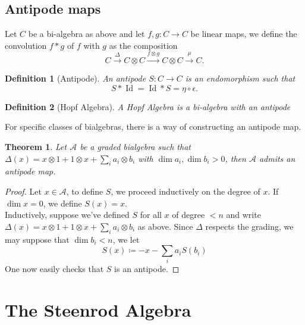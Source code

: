 \documentclass[11pt, a4paper]{article}
\DeclareMathOperator*{\id}{Id}
\newtheorem{thm}{Theorem}
\newtheorem{defn}{Definition}
\theoremstyle{plain}
\newtheorem*{proof}{Proof}
\begin{document}
\subsection{Antipode maps}
Let $C$ be a bi-algebra as above and let $f,g\colon C\to C$ be linear maps, we define the convolution $f\ast g$ of $f$ with $g$ as the composition
\[ 
	C \xrightarrow{\Delta} C\otimes C \xrightarrow{f\otimes g} C\otimes C \xrightarrow{\mu} C.
\]
\begin{defn}[Antipode]
	An antipode $S\colon C\to C$ is an endomorphism such that
	\[ 
	S\ast \id = \id\ast S = \eta\circ \epsilon.
	\]
\end{defn}
\begin{defn}[Hopf Algebra]
A Hopf Algebra is a bi-algebra with an antipode
\end{defn}
For specific classes of bialgebras, there is a way of constructing an antipode map.
\begin{thm}
Let $\mathcal{A}$ be a graded bialgebra such that $\Delta( x) = x\otimes 1 + 1 \otimes x + \sum_i a_i \otimes b_i $ with $\dim a_i,\dim b_i >0$, then $\mathcal{A}$ admits an antipode map.
\end{thm}
\begin{proof}
Let $x \in \mathcal{A}$, to define $S$, we proceed inductively on the degree of $x$. If $\dim x = 0$, we define $S( x) = x$.\\
Inductively, suppose we've defined $S$ for all $x$ of degree $<n$ and write $\Delta( x) = x\otimes 1 + 1 \otimes x + \sum_i a_i \otimes b_i$ as above. Since $\Delta$ respects the grading, we may suppose that $\dim b_i <n$, we let
\[ 
S( x) \coloneq -x - \sum_i a_i S( b_i) 
\]
One now easily checks that $S$ is an antipode.
\end{proof}



\section{The Steenrod Algebra}
\end{document}

